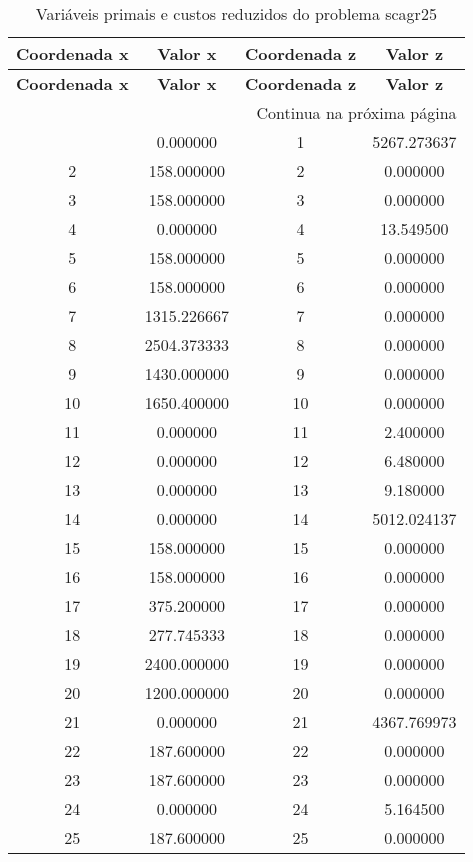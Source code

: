\documentclass[12pt]{article}
\begin{document}
\begin{longtable}{@{}cccc@{}}
\caption{Variáveis primais e custos reduzidos do problema scagr25} \\
\toprule
\textbf{Coordenada x} & \textbf{Valor x} & \textbf{Coordenada z} & \textbf{Valor z} \\
\midrule
\endfirsthead

\toprule
\textbf{Coordenada x} & \textbf{Valor x} & \textbf{Coordenada z} & \textbf{Valor z} \\
\midrule
\endhead

\midrule \multicolumn{4}{r}{{Continua na próxima página}} \\ \midrule
\endfoot

\bottomrule
\endlastfoot
1 & 0.000000 & 1 & 5267.273637 \\
2 & 158.000000 & 2 & 0.000000 \\
3 & 158.000000 & 3 & 0.000000 \\
4 & 0.000000 & 4 & 13.549500 \\
5 & 158.000000 & 5 & 0.000000 \\
6 & 158.000000 & 6 & 0.000000 \\
7 & 1315.226667 & 7 & 0.000000 \\
8 & 2504.373333 & 8 & 0.000000 \\
9 & 1430.000000 & 9 & 0.000000 \\
10 & 1650.400000 & 10 & 0.000000 \\
11 & 0.000000 & 11 & 2.400000 \\
12 & 0.000000 & 12 & 6.480000 \\
13 & 0.000000 & 13 & 9.180000 \\
14 & 0.000000 & 14 & 5012.024137 \\
15 & 158.000000 & 15 & 0.000000 \\
16 & 158.000000 & 16 & 0.000000 \\
17 & 375.200000 & 17 & 0.000000 \\
18 & 277.745333 & 18 & 0.000000 \\
19 & 2400.000000 & 19 & 0.000000 \\
20 & 1200.000000 & 20 & 0.000000 \\
21 & 0.000000 & 21 & 4367.769973 \\
22 & 187.600000 & 22 & 0.000000 \\
23 & 187.600000 & 23 & 0.000000 \\
24 & 0.000000 & 24 & 5.164500 \\
25 & 187.600000 & 25 & 0.000000 \\

\end{longtable}
\end{document}
